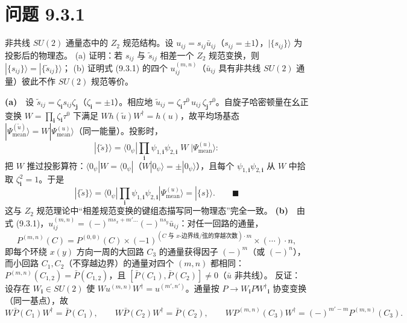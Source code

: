 \section*{问题 9.3.1}
\begin{problem}
非共线 $SU(2)$ 通量态中的 $Z_2$ 规范结构。设 $u_{ij}=s_{ij}\bar{u}_{ij}$（$s_{ij}=\pm1$），$|\{s_{ij}\}\rangle$ 为投影后的物理态。
(a) 证明：若 $s_{ij}$ 与 $\tilde{s}_{ij}$ 相差一个 $Z_2$ 规范变换，则 $|\{s_{ij}\}\rangle=|\{\tilde{s}_{ij}\}\rangle$；
(b) 证明式 (9.3.1) 的四个 $u^{(m,n)}_{ij}$（$\bar{u}_{ij}$ 具有非共线 $SU(2)$ 通量）彼此不作 $SU(2)$ 规范等价。
\end{problem}
\solution
\textbf{(a)}　设 $\tilde{s}_{ij}=\zeta_{\pmb{i}}s_{ij}\zeta_{\pmb{j}}$（$\zeta_{\pmb{i}}=\pm1$）。相应地 $\tilde{u}_{ij}=\zeta_{\pmb{i}}\tau^0\,u_{ij}\,\zeta_{\pmb{j}}\tau^0$。自旋子哈密顿量在幺正变换 $W=\prod_{\pmb{i}}\zeta_{\pmb{i}}\tau^0$ 下满足 $W h(\tilde{u}) W^{\dagger}=h(u)$，故平均场基态 $|\Psi^{(\tilde{u})}_{\text{mean}}\rangle=W|\Psi^{(u)}_{\text{mean}}\rangle$（同一能量）。投影时，
\begin{equation*}
|\{\tilde{s}\}\rangle=\langle0_\psi|\prod_{\pmb{i}}\psi_{1,\pmb{i}}\psi_{2,\pmb{i}}\;W\;|\Psi^{(u)}_{\text{mean}}\rangle :
\end{equation*}
把 $W$ 推过投影算符：$\langle0_\psi|W=\langle0_\psi|$（$W|0_\psi\rangle=\pm|0_\psi\rangle$），且每个 $\psi_{1,\pmb{i}}\psi_{2,\pmb{i}}$ 从 $W$ 中拾取 $\zeta_{\pmb{i}}^2=1$。于是
\begin{equation*}
|\{\tilde{s}\}\rangle=\langle0_\psi|\prod_{\pmb{i}}\psi_{1,\pmb{i}}\psi_{2,\pmb{i}}|\Psi^{(u)}_{\text{mean}}\rangle=|\{s\}\rangle .\qquad\blacksquare
\end{equation*}
这与 $Z_2$ 规范理论中“相差规范变换的键组态描写同一物理态”完全一致。
\textbf{(b)}　由式 (9.3.1)，$u^{(m,n)}_{ij}=(-)^{ms_x+m'\dots}(-)^{ns_y}\bar{u}_{ij}$：对任一回路的通量，
\begin{equation*}
P^{(m,n)}(C)=P^{(0,0)}(C)\times(-1)^{(\text{$C$ 与 }x\text{-边界线/弦的穿越次数})\cdot m}\times(\cdots)\cdot n ,
\end{equation*}
即每个环绕 $x(y)$ 方向一周的大回路 $C_3$ 的通量获得因子 $(-)^{m}$（或 $(-)^n$），而小回路 $C_1,C_2$（不穿越边界）的通量对四个 $(m,n)$ 都相同：$P^{(m,n)}(C_{1,2})=\bar{P}(C_{1,2})$，且 $[\bar P(C_1),\bar P(C_2)]\neq0$（$\bar{u}$ 非共线）。
反证：设存在 $W_{\pmb{i}}\in SU(2)$ 使 $W u^{(m,n)}W^{\dagger}=u^{(m',n')}$。通量按 $P\to W_{\pmb{i}}PW^{\dagger}{}_{\pmb{i}}$ 协变变换（同一基点），故
\begin{equation*}
W\bar P(C_1)W^{\dagger}=\bar P(C_1),\qquad W\bar P(C_2)W^{\dagger}=\bar P(C_2),\qquad
W P^{(m,n)}(C_3)W^{\dagger}=(-)^{m'-m}P^{(m,n)}(C_3) .
\end{equation*}
